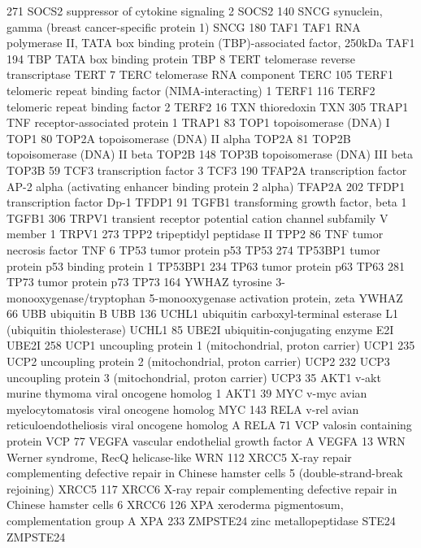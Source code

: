 271	SOCS2	suppressor of cytokine signaling 2	SOCS2
140	SNCG	synuclein, gamma (breast cancer-specific protein 1)	SNCG
180	TAF1	TAF1 RNA polymerase II, TATA box binding protein (TBP)-associated factor, 250kDa	TAF1
194	TBP	TATA box binding protein	TBP
8	TERT	telomerase reverse transcriptase	TERT
7	TERC	telomerase RNA component	TERC
105	TERF1	telomeric repeat binding factor (NIMA-interacting) 1	TERF1
116	TERF2	telomeric repeat binding factor 2	TERF2
16	TXN	thioredoxin	TXN
305	TRAP1	TNF receptor-associated protein 1	TRAP1
83	TOP1	topoisomerase (DNA) I	TOP1
80	TOP2A	topoisomerase (DNA) II alpha	TOP2A
81	TOP2B	topoisomerase (DNA) II beta	TOP2B
148	TOP3B	topoisomerase (DNA) III beta	TOP3B
59	TCF3	transcription factor 3	TCF3
190	TFAP2A	transcription factor AP-2 alpha (activating enhancer binding protein 2 alpha)	TFAP2A
202	TFDP1	transcription factor Dp-1	TFDP1
91	TGFB1	transforming growth factor, beta 1	TGFB1
306	TRPV1	transient receptor potential cation channel subfamily V member 1	TRPV1
273	TPP2	tripeptidyl peptidase II	TPP2
86	TNF	tumor necrosis factor	TNF
6	TP53	tumor protein p53	TP53
274	TP53BP1	tumor protein p53 binding protein 1	TP53BP1
234	TP63	tumor protein p63	TP63
281	TP73	tumor protein p73	TP73
164	YWHAZ	tyrosine 3-monooxygenase/tryptophan 5-monooxygenase activation protein, zeta	YWHAZ
66	UBB	ubiquitin B	UBB
136	UCHL1	ubiquitin carboxyl-terminal esterase L1 (ubiquitin thiolesterase)	UCHL1
85	UBE2I	ubiquitin-conjugating enzyme E2I	UBE2I
258	UCP1	uncoupling protein 1 (mitochondrial, proton carrier)	UCP1
235	UCP2	uncoupling protein 2 (mitochondrial, proton carrier)	UCP2
232	UCP3	uncoupling protein 3 (mitochondrial, proton carrier)	UCP3
35	AKT1	v-akt murine thymoma viral oncogene homolog 1	AKT1
39	MYC	v-myc avian myelocytomatosis viral oncogene homolog	MYC
143	RELA	v-rel avian reticuloendotheliosis viral oncogene homolog A	RELA
71	VCP	valosin containing protein	VCP
77	VEGFA	vascular endothelial growth factor A	VEGFA
13	WRN	Werner syndrome, RecQ helicase-like	WRN
112	XRCC5	X-ray repair complementing defective repair in Chinese hamster cells 5 (double-strand-break rejoining)	XRCC5
117	XRCC6	X-ray repair complementing defective repair in Chinese hamster cells 6	XRCC6
126	XPA	xeroderma pigmentosum, complementation group A	XPA
233	ZMPSTE24	zinc metallopeptidase STE24	ZMPSTE24